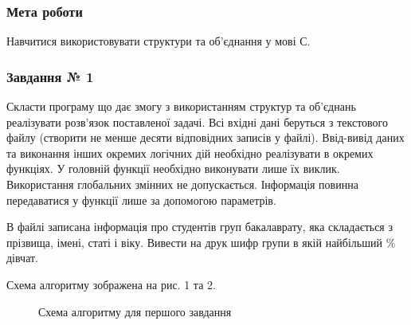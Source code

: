 \documentclass[12pt]{extreport}
\begin{document}


\subsubsection*{Мета роботи}
Навчитися використовувати структури та об’єднання у мові С.

\bigskip
\subsubsection*{Завдання № 1}
Скласти програму що дає змогу з використанням структур та об'єднань
реалізувати розв’язок поставленої задачі. Всі вхідні дані беруться з текстового
файлу (створити не менше десяти відповідних записів у файлі). Ввід-вивід даних
та виконання інших окремих логічних дій необхідно реалізувати в окремих
функціях. У головній функції необхідно виконувати лише їх виклик.
Використання глобальних змінних не допускається. Інформація повинна
передаватися у функції лише за допомогою параметрів.

В файлі записана інформація про студентів груп бакалаврату, яка
складається з прізвища, імені, статі і віку. Вивести на друк шифр групи в
якій найбільший \% дівчат.
\bigskip

Схема алгоритму зображена на рис. 1 та 2.

\begin{figure}[h]
	\centering
	
	\caption{Схема алгоритму для першого завдання}
\end{figure}
\end{document}
